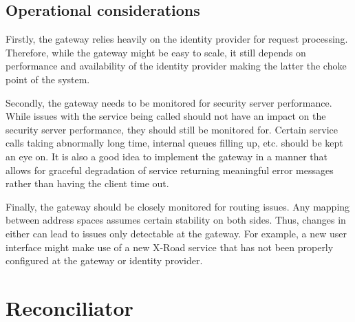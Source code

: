 \documentclass[10pt,a4paper]{article}
\begin{document}
\subsection{Operational considerations}
\label{sec:p:8:ops}
Firstly, the gateway relies heavily on the identity provider for request processing. Therefore, while the gateway might be easy to scale, it still depends on performance and availability of the identity provider making the latter the choke point of the system. 

Secondly, the gateway needs to be monitored for security server performance. While issues with the service being called should not have an impact on the security server performance, they should still be monitored for. Certain service calls taking abnormally long time, internal queues filling up, etc. should be kept an eye on. It is also a good idea to implement the gateway in a manner that allows for graceful degradation of service returning meaningful error messages rather than having the client time out.

Finally, the gateway should be closely monitored for routing issues. Any mapping between address spaces assumes certain stability on both sides. Thus, changes in either can lead to issues only detectable at the gateway. For example, a new user interface might make use of a new X-Road service that has not been properly configured at the gateway or identity provider. 


 
\section{Reconciliator}
\label{sec:p:9}
\end{document}
